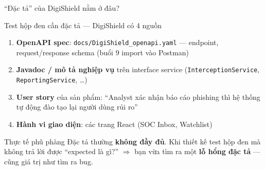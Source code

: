 \documentclass[aspectratio=169,12pt]{beamer}
\begin{document}
\begin{frame}{``Đặc tả'' của DigiShield nằm ở đâu?}
  \begin{block}{Test hộp đen cần đặc tả --- DigiShield có 4 nguồn}
    \begin{enumerate}
      \item \textbf{OpenAPI spec}: \texttt{docs/DigiShield\_openapi.yaml}
        --- endpoint, request/response schema (buổi 9 import vào Postman)
      \item \textbf{Javadoc / mô tả nghiệp vụ} trên interface service
        (\texttt{InterceptionService}, \texttt{ReportingService}, \ldots)
      \item \textbf{User story} của sản phẩm: ``Analyst xác nhận báo cáo
        phishing thì hệ thống tự động đào tạo lại người dùng rủi ro''
      \item \textbf{Hành vi giao diện}: các trang React (SOC Inbox, Watchlist)
    \end{enumerate}
  \end{block}

  \vspace{0.3em}
  \begin{alertblock}{Thực tế phũ phàng}
    Đặc tả thường \textbf{không đầy đủ}. Khi thiết kế test hộp đen mà không
    trả lời được ``expected là gì?'' $\Rightarrow$ bạn vừa tìm ra một
    \textbf{lỗ hổng đặc tả} --- cũng giá trị như tìm ra bug.
  \end{alertblock}
\end{frame}
\end{document}
